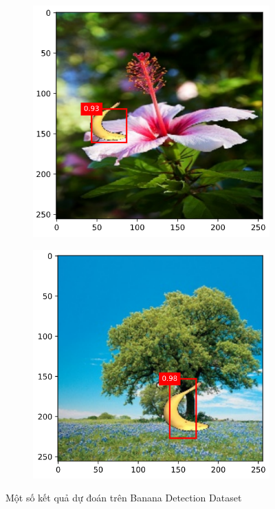 \documentclass{article}
\begin{document}
\begin{figure}[ht!]
\begin{subfigure}[b]{0.45\linewidth}
        \label{fig8b}
    \end{subfigure}
        \begin{subfigure}[b]{0.45\linewidth}
        \includegraphics[width = \linewidth]{Screenshot 2023-05-26 213210.png}
        \label{fig8c}
    \end{subfigure}
        \begin{subfigure}[b]{0.45\linewidth}
        \includegraphics[width = \linewidth]{Screenshot 2023-05-26 213230.png}
        \label{fig8d}
    \end{subfigure}
    \label{fig8}
    \caption{Một số kết quả dự đoán trên Banana Detection Dataset}
\end{figure}
\end{document}
